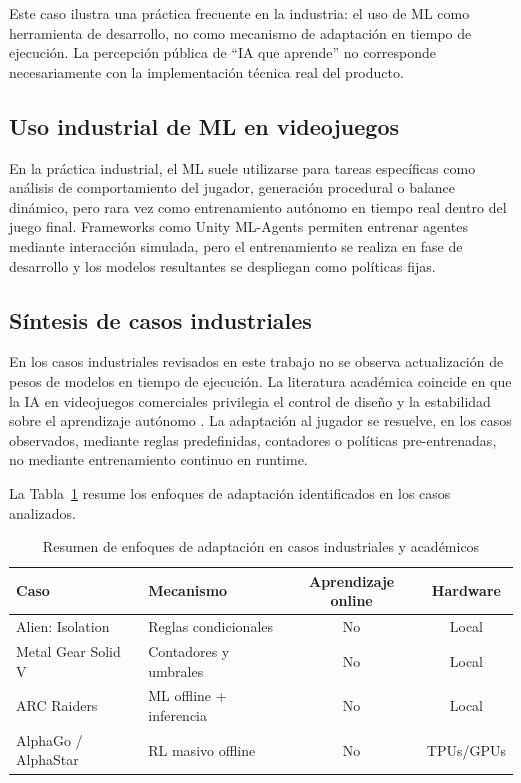 Este caso ilustra una práctica frecuente en la industria: el uso de ML como herramienta de desarrollo, no como mecanismo de adaptación en tiempo de ejecución. La percepción pública de ``IA que aprende'' no corresponde necesariamente con la implementación técnica real del producto.

\subsection{Uso industrial de ML en videojuegos}

En la práctica industrial, el ML suele utilizarse para tareas específicas como análisis de comportamiento del jugador, generación procedural o balance dinámico, pero rara vez como entrenamiento autónomo en tiempo real dentro del juego final. Frameworks como Unity ML-Agents \cite{juliani2018mlagents} permiten entrenar agentes mediante interacción simulada, pero el entrenamiento se realiza en fase de desarrollo y los modelos resultantes se despliegan como políticas fijas.

\subsection{Síntesis de casos industriales}

En los casos industriales revisados en este trabajo no se observa actualización de pesos de modelos en tiempo de ejecución. La literatura académica coincide en que la IA en videojuegos comerciales privilegia el control de diseño y la estabilidad sobre el aprendizaje autónomo \cite{yannakakis2018ai}. La adaptación al jugador se resuelve, en los casos observados, mediante reglas predefinidas, contadores o políticas pre-entrenadas, no mediante entrenamiento continuo en runtime.

La Tabla~\ref{tab:estado_arte_casos} resume los enfoques de adaptación identificados en los casos analizados.

\begin{table}[H]
\centering
\caption{Resumen de enfoques de adaptación en casos industriales y académicos}
\begin{tabular}{llcc}
\hline
\textbf{Caso} & \textbf{Mecanismo} & \textbf{Aprendizaje online} & \textbf{Hardware} \\
\hline
Alien: Isolation & Reglas condicionales & No & Local \\
Metal Gear Solid V & Contadores y umbrales & No & Local \\
ARC Raiders & ML offline + inferencia & No & Local \\
AlphaGo / AlphaStar & RL masivo offline & No & TPUs/GPUs \\
\hline
\end{tabular}
\label{tab:estado_arte_casos}
\end{table}

